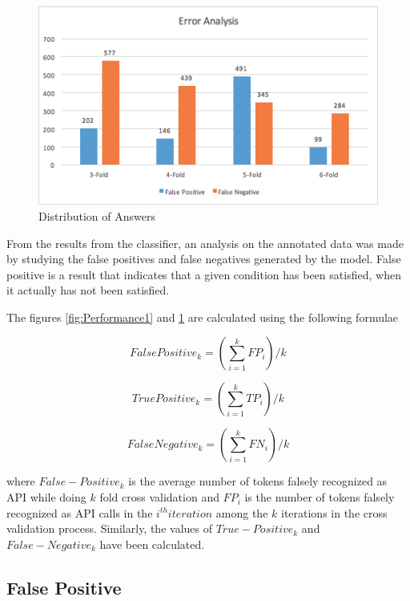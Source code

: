 \documentclass{sig-alternate-05-2015}
\begin{document}
\begin{figure}
\centering
  \includegraphics[width=\linewidth]{Performance2.png}
  \caption{Distribution of Answers}
  \label{fig:Performance2}
\end{figure}

From the results from the classifier, an analysis on the annotated data was made by studying the false positives and false negatives generated by the model. False positive is a result that indicates that a given condition has been satisfied, when it actually has not been satisfied.

The figures \ref{fig:Performance1} and \ref{fig:Performance2} are calculated using the following formulae

\begin{equation}
False Positive_k = (\sum_{i = 1}^{k} FP_i)/k
\end{equation}

\begin{equation}
True Positive_k = (\sum_{i = 1}^{k} TP_i)/k
\end{equation}

\begin{equation}
False Negative_k = (\sum_{i = 1}^{k} FN_i)/k
\end{equation}

where $False-Positive_k$ is the average number of tokens falsely recognized as API while doing $k$ fold cross validation and $FP_i$ is the number of tokens falsely recognized as API calls in the $i^{th} iteration$ among the $k$ iterations in the cross validation process. Similarly, the values of $True-Positive_k$ and $False-Negative_k$ have been calculated.

\subsection{False Positive}
\end{document}
